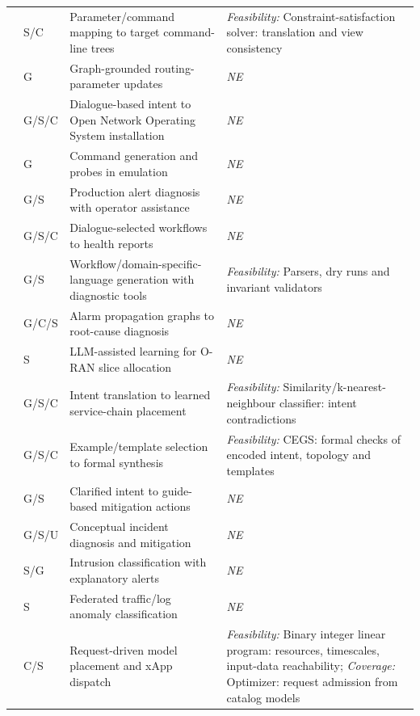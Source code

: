 \begin{longtable}{>{\raggedright\arraybackslash}p{.09\soklitwidth}>{\centering\arraybackslash}p{.07\soklitwidth}>{\raggedright\arraybackslash}p{.36\soklitwidth}>{\raggedright\arraybackslash}p{.48\soklitwidth}}
\addlinespace[1pt]
\cite{e0sourceS03} & S/C & Parameter/command mapping to target command-line trees & \emph{Feasibility:} Constraint-satisfaction solver: translation and view consistency \\
\addlinespace[1pt]
\cite{e0sourceS04} & G & Graph-grounded routing-parameter updates & \textit{NE} \\
\addlinespace[1pt]
\cite{e0sourceS05} & G/S/C & Dialogue-based intent to Open Network Operating System installation & \textit{NE} \\
\addlinespace[1pt]
\cite{e0sourceS06} & G & Command generation and probes in emulation & \textit{NE} \\
\addlinespace[1pt]
\cite{e0sourceS08} & G/S & Production alert diagnosis with operator assistance & \textit{NE} \\
\addlinespace[1pt]
\cite{e0sourceS09} & G/S/C & Dialogue-selected workflows to health reports & \textit{NE} \\
\addlinespace[1pt]
\cite{e0sourceS10} & G/S & Workflow/domain-specific-language generation with diagnostic tools & \emph{Feasibility:} Parsers, dry runs and invariant validators \\
\addlinespace[1pt]
\cite{e0sourceS12} & G/C/S & Alarm propagation graphs to root-cause diagnosis & \textit{NE} \\
\addlinespace[1pt]
\cite{e0sourceS15} & S & LLM-assisted learning for O-RAN slice allocation & \textit{NE} \\
\addlinespace[1pt]
\cite{asif2025ribn} & G/S/C & Intent translation to learned service-chain placement & \emph{Feasibility:} Similarity/k-nearest-neighbour classifier: intent contradictions \\
\addlinespace[1pt]
\cite{e0sourceS17} & G/S/C & Example/template selection to formal synthesis & \emph{Feasibility:} CEGS: formal checks of encoded intent, topology and templates \\
\addlinespace[1pt]
\cite{e0sourceS18} & G/S & Clarified intent to guide-based mitigation actions & \textit{NE} \\
\addlinespace[1pt]
\cite{e0sourceS19} & G/S/U & Conceptual incident diagnosis and mitigation & \textit{NE} \\
\addlinespace[1pt]
\cite{e0sourceS20} & S/G & Intrusion classification with explanatory alerts & \textit{NE} \\
\addlinespace[1pt]
\cite{e0sourceS21} & S & Federated traffic/log anomaly classification & \textit{NE} \\
\addlinespace[1pt]
\cite{doro2022orchestran} & C/S & Request-driven model placement and xApp dispatch & \emph{Feasibility:} Binary integer linear program: resources, timescales, input-data reachability; \emph{Coverage:} Optimizer: request admission from catalog models \\

\end{longtable}
